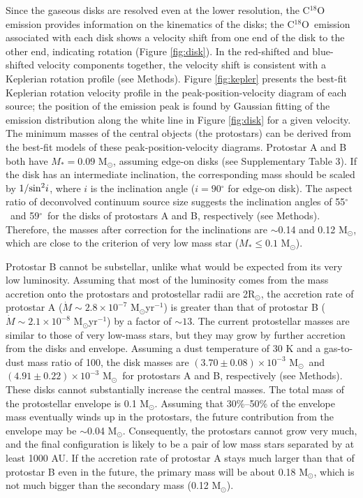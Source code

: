 \documentclass{nature}
\newcommand{\msun}{\mbox{M$_\odot$}}%
\newcommand{\rsun}{\mbox{R$_\odot$}}%
\newcommand{\cooo}{\mbox{C$^{18}$O}}
\newcommand{\degree}{\mbox{$^\circ$}}
\begin{document}
Since the gaseous disks are resolved even at the lower resolution, 
the C$^{18}$O emission provides information
on the kinematics of the disks;
the \cooo\ emission associated with each disk shows
a velocity shift from one end of the disk to the other end,
indicating rotation (Figure \ref{fig:disk}).
In the red-shifted and blue-shifted velocity components together,
the velocity shift is consistent with a Keplerian rotation profile (see Methods).
Figure \ref{fig:kepler} presents the best-fit Keplerian rotation velocity profile in the peak-position-velocity diagram
of each source; the position of the emission peak  is found by Gaussian fitting of the emission
distribution along the white line in Figure \ref{fig:disk} for a given velocity.
The minimum masses of the central objects (the protostars)
can be derived from the best-fit models of these peak-position-velocity diagrams.
Protostar A and B both have $M_*=0.09$ \msun, assuming edge-on disks (see Supplementary Table 3).
If the disk has an intermediate inclination,
the corresponding mass should be scaled by $1/{\rm sin}^2i$,
where $i$ is the inclination angle ($i=90\degree$ for edge-on disk).
The aspect ratio of deconvolved continuum source size suggests
the inclination angles of  55\degree\ and 59\degree\ for the disks of protostars A and B, respectively (see Methods). 
Therefore, the masses after correction for the inclinations are $\sim$0.14 and 0.12 \msun,  which are close to
the criterion of very low mass star ($M_*\le 0.1$ \msun). 

Protostar B cannot be substellar, unlike what would be expected from its very low luminosity\cite{Bulger2014}.
Assuming that most of the luminosity
comes from the mass accretion onto the protostars and protostellar radii are 2\rsun,
the accretion rate of protostar A ($\dot{M}\sim2.8\times 10^{-7}$ \msun yr$^{-1}$)
is greater than that of protostar B ($\dot{M}\sim2.1\times 10^{-8}$ \msun yr$^{-1}$)
by a factor of $\sim13$.
The current protostellar masses are similar to those of very low-mass stars,
but they may grow by further accretion from the disks and envelope.
Assuming a dust temperature of 30 K and a gas-to-dust mass ratio of 100, 
the disk masses are $(3.70 \pm 0.08) \times 10^{-3}$ \msun\
and $(4.91\pm 0.22) \times 10^{-3}$ \msun\ for protostars A and B,
respectively (see Methods). 
These disks cannot substantially increase the central masses. 
The total mass of the protostellar envelope is 0.1 \msun\cite{Young2006}.
Assuming that 30\%--50\% of the envelope mass
eventually winds up in the protostars\cite{Dunham2014},
the future contribution from the envelope may be $\sim$0.04 \msun.
Consequently, the protostars cannot grow very much,
and the final configuration is likely to be a pair of low mass stars
separated by at least 1000 AU.
If the accretion rate of protostar A
stays much larger than that of protostar B even in the future,
the primary mass will be about 0.18 \msun, which is not much bigger than the secondary mass (0.12 \msun).
\end{document}
